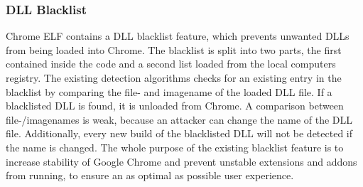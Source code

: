 \subsubsection{\gls{DLL} Blacklist}
Chrome ELF contains a \gls{DLL} blacklist feature, which prevents unwanted \glspl{DLL} from being loaded into Chrome. The blacklist is split into two parts, the first contained inside the code and a second list loaded from the local computers registry. The existing detection algorithms checks for an existing entry in the blacklist by comparing the file- and imagename of the loaded \gls{DLL} file. If a blacklisted \gls{DLL} is found, it is unloaded from Chrome. A comparison between file-/imagenames is  weak, because an attacker can change the name of the \gls{DLL} file. Additionally, every new build of the blacklisted \gls{DLL} will not be detected if the name is changed. The whole purpose of the existing blacklist feature is to increase stability of Google Chrome and prevent unstable extensions and addons from running, to ensure an as optimal as possible user experience.